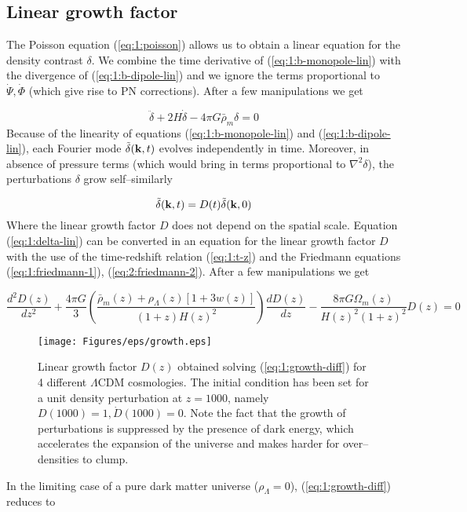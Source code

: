 \subsection{Linear growth factor}
The Poisson equation (\ref{eq:1:poisson}) allows us to obtain a linear equation for the density contrast $\delta$. We combine the time derivative of (\ref{eq:1:b-monopole-lin}) with the divergence of (\ref{eq:1:b-dipole-lin}) and we ignore the terms proportional to $\dot{\Psi},\dot{\Phi}$ (which give rise to PN corrections). After a few manipulations we get 

\begin{equation}
\label{eq:1:delta-lin}
\ddot{\delta} + 2H\dot{\delta} - 4\pi G\bar{\rho}_m\delta = 0  
\end{equation} 
%
Because of the linearity of equations (\ref{eq:1:b-monopole-lin}) and (\ref{eq:1:b-dipole-lin}), each Fourier mode $\tilde{\delta}(\mathbf{k},t)$ evolves independently in time. Moreover, in absence of pressure terms (which would bring in terms proportional to $\nabla^2\delta$), the perturbations $\delta$ grow self--similarly

\begin{equation}
\label{eq:1:selfsim}
\tilde{\delta}(\mathbf{k},t) = D(t)\tilde{\delta}(\mathbf{k},0)
\end{equation}
%
Where the linear growth factor $D$ does not depend on the spatial scale. Equation (\ref{eq:1:delta-lin}) can be converted in an equation for the linear growth factor $D$ with the use of the time-redshift relation (\ref{eq:1:t-z}) and the Friedmann equations (\ref{eq:1:friedmann-1}), (\ref{eq:2:friedmann-2}). After a few manipulations we get

\begin{equation}
\label{eq:1:growth-diff}
\frac{d^2D(z)}{dz^2} + \frac{4\pi G}{3}\left(\frac{\bar{\rho}_m(z)+\rho_\Lambda(z)[1+3w(z)]}{(1+z)H(z)^2}\right)\frac{dD(z)}{dz}-\frac{8\pi G\Omega_m(z)}{H(z)^2(1+z)^2}D(z)= 0
\end{equation}
%
\begin{figure}
\begin{center}
\texttt{[image: Figures/eps/growth.eps]}
\end{center}
\caption{Linear growth factor $D(z)$ obtained solving (\ref{eq:1:growth-diff}) for 4 different $\Lambda$CDM cosmologies. The initial condition has been set for a unit density perturbation at $z=1000$, namely $D(1000)=1, \dot{D}(1000)=0$. Note the fact that the growth of perturbations is suppressed by the presence of dark energy, which accelerates the expansion of the universe and makes harder for over--densities to clump.}
\label{fig:1:growth}
\end{figure}
%
In the limiting case of a pure dark matter universe ($\rho_\Lambda=0$), (\ref{eq:1:growth-diff}) reduces to

